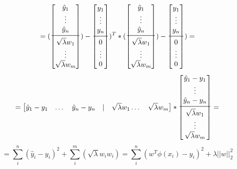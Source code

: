 \documentclass[11pt]{article}
\begin{document}
\[=
(\begin{bmatrix}
  \hat{y}_{1}\\
  \vdots \\
  \hat{y}_{n}\\
  \midrule
  \sqrt{\lambda} w_{1}\\
  \vdots\\
  \sqrt{\lambda} w_{m}
\end{bmatrix})
-\begin{bmatrix}
  y_{1}\\
  \vdots \\
  y_{n}\\
  \midrule
  0\\
  \vdots\\
  0
\end{bmatrix})^T *
(\begin{bmatrix}
  \hat{y}_{1}\\
  \vdots \\
  \hat{y}_{n}\\
  \midrule
  \sqrt{\lambda} w_{1}\\
  \vdots\\
  \sqrt{\lambda} w_{m}
\end{bmatrix})
-\begin{bmatrix}
  y_{1}\\
  \vdots \\
  y_{n}\\
  \midrule
  0\\
  \vdots\\
  0
\end{bmatrix})=
\]
\[=
\begin{bmatrix}
  \hat{y}_{1}-{y}_{1}&\dots & \hat{y}_{n}-{y}_{n} &\vert  & \sqrt{\lambda} w_{1} \dots & \sqrt{\lambda} w_{m}\\
\end{bmatrix}*
\begin{bmatrix}
  \hat{y}_{1}-{y}_{1}\\
  \vdots \\
  \hat{y}_{n}-{y}_{n}\\
  \midrule
  \sqrt{\lambda} w_{1}\\
  \vdots\\
  \sqrt{\lambda} w_{m}
\end{bmatrix}=
\]
$$=\sum_{i}^{n}(\hat{y}_{i}-y_{i})^2+\sum_{i}^{m}(\sqrt{\lambda}w_{i}w_{i})=\sum_{i}^{n}(w^T\phi(x_{i})-y_{i})^2+ \lambda||w||^2_{2}
$$
\end{document}
